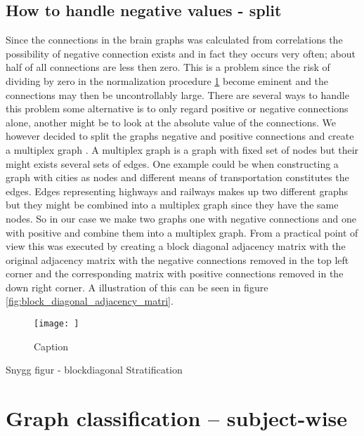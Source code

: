\subsection{How to handle negative values - split}
Since the connections in the brain graphs was calculated from correlations the possibility of negative connection exists and in fact they occurs very often; about half of all connections are less then zero. This is a problem since the risk of dividing by zero in the normalization procedure \ref{} become eminent and the connections may then be uncontrollably large. There are several ways to handle this problem some alternative is to only regard positive or negative connections alone, another might be to look at the absolute value of the connections. We however decided to split the graphs negative and positive connections and create a multiplex graph \cite{}. A multiplex graph is a graph with fixed set of nodes but their might exists several sets of edges. One example could be when constructing a graph with cities as nodes and different means of transportation constitutes the edges. Edges representing highways and railways makes up two different graphs but they might be combined into a multiplex graph since they have the same nodes. So in our case we make two graphs one with negative connections and one with positive and combine them into a multiplex graph. From a practical point of view this was executed by creating a block diagonal adjacency matrix with the original adjacency matrix with the negative connections removed in the top left corner and the corresponding matrix with positive connections removed in the down right corner. A illustration of this can be seen in figure \ref{fig:block_diagonal_adjacency_matri}.

\begin{figure}
    \centering
    \texttt{[image: ]}
    \caption{Caption}
    \label{fig:block_diagonal_adjacency_matrix}
\end{figure}

Snygg figur - blockdiagonal
Stratification

\section{Graph classification -- subject-wise}
